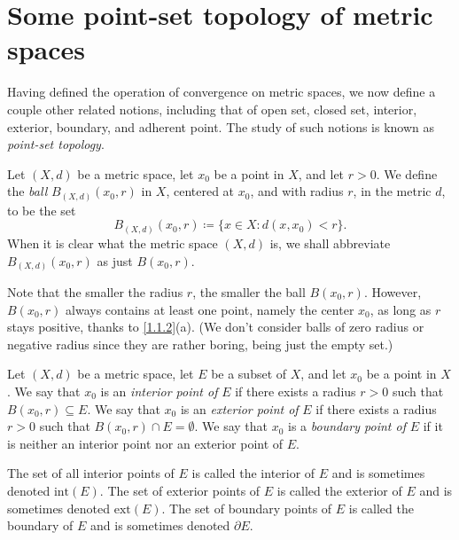 \section{Some point-set topology of metric spaces}\label{sec:1.2}

\begin{note}
  Having defined the operation of convergence on metric spaces, we now define a couple other related notions, including that of open set, closed set, interior, exterior, boundary, and adherent point.
  The study of such notions is known as \emph{point-set topology}.
\end{note}

\begin{defn}[Balls]\label{1.2.1}
  Let \((X, d)\) be a metric space, let \(x_0\) be a point in \(X\), and let \(r > 0\).
  We define the \emph{ball} \(B_{(X, d)}(x_0, r)\) in \(X\), centered at \(x_0\), and with radius \(r\), in the metric \(d\), to be the set
  \[
    B_{(X, d)}(x_0, r) \coloneqq \{x \in X : d(x, x_0) < r\}.
  \]
  When it is clear what the metric space \((X, d)\) is, we shall abbreviate \(B_{(X, d)}(x_0, r)\) as just \(B(x_0, r)\).
\end{defn}

\setcounter{thm}{3}
\begin{rmk}\label{1.2.4}
  Note that the smaller the radius \(r\), the smaller the ball \(B(x_0 , r)\).
  However, \(B(x_0 , r)\) always contains at least one point, namely the center \(x_0\), as long as \(r\) stays positive, thanks to \cref{1.1.2}(a).
  (We don't consider balls of zero radius or negative radius since they are rather boring, being just the empty set.)
\end{rmk}

\begin{defn}\label{1.2.5}
  Let \((X, d)\) be a metric space, let \(E\) be a subset of \(X\), and let \(x_0\) be a point in \(X\).
  We say that \(x_0\) is an \emph{interior point of} \(E\) if there exists a radius \(r > 0\) such that \(B(x_0, r) \subseteq E\).
  We say that \(x_0\) is an \emph{exterior point of} \(E\) if there exists a radius \(r > 0\) such that \(B(x_0, r) \cap E = \emptyset\).
  We say that \(x_0\) is a \emph{boundary point of} \(E\) if it is neither an interior point nor an exterior point of \(E\).
\end{defn}

\begin{note}
  The set of all interior points of \(E\) is called the interior of \(E\) and is sometimes denoted \(\text{int}(E)\).
  The set of exterior points of \(E\) is called the exterior of \(E\) and is sometimes denoted \(\text{ext}(E)\).
  The set of boundary points of \(E\) is called the boundary of \(E\) and is sometimes denoted \(\partial E\).
\end{note}

